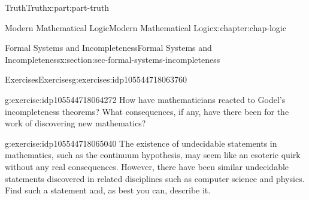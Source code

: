 \documentclass[oneside,10pt,]{book}
\numberwithin{equation}{section}
\begin{document}
\begin{partptx}{Truth}{}{Truth}{}{}{x:part:part-truth}
\begin{chapterptx}{Modern Mathematical Logic}{}{Modern Mathematical Logic}{}{}{x:chapter:chap-logic}
\begin{sectionptx}{Formal Systems and Incompleteness}{}{Formal Systems and Incompleteness}{}{}{x:section:sec-formal-systems-incompleteness}
\begin{exercises-subsection}{Exercises}{}{Exercises}{}{}{g:exercises:idp105544718063760}
\begin{divisionexercise}{1}{}{}{g:exercise:idp105544718064272}
How have mathematicians reacted to Godel's incompleteness theorems? What consequences, if any, have there been for the work of discovering new mathematics?%
\end{divisionexercise}%
\begin{divisionexercise}{2}{}{}{g:exercise:idp105544718065040}%
The existence of undecidable statements in mathematics, such as the continuum hypothesis, may seem like an esoteric quirk without any real consequences. However, there have been similar undecidable statements discovered in related disciplines such as computer science and physics. Find such a statement and, as best you can, describe it.%
\end{divisionexercise}%
\end{exercises-subsection}
\end{sectionptx}
\end{chapterptx}
\end{partptx}
%
%
\typeout{************************************************}
\typeout{************************************************}
%
\end{document}
